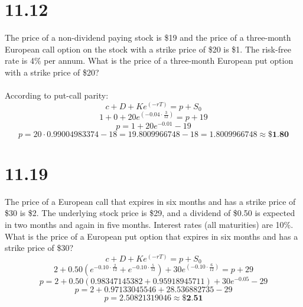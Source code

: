 \documentclass{article}
\begin{document}
\thispagestyle{firstpageheader}
{\Large 

\section*{11.12}
The price of a non-dividend paying stock is \$19 and the price of a three-month European call option on the stock with a strike price of \$20 is \$1. The risk-free rate is 4\% per annum. What
is the price of a three-month European put option with a strike price of \$20? \\ \\
According to put-call parity:
\[
  c + D + Ke^{(-rT)} = p + S_0
\]
\[
  1 + 0 + 20e^{(-0.04 \cdot \frac{3}{12})} = p + 19
\]
\[
  p = 1 + 20e^{-0.01} - 19
\]
\[
  p = 20 \cdot 0.99004983374 - 18 = 19.8009966748 - 18 = 1.8009966748 \approx \boxed{\textbf{\$1.80}}
\]


}
{\Large 

\section*{11.19}
The price of a European call that expires in six months and has a strike price of \$30 is \$2. The underlying stock price is \$29, and a dividend of \$0.50 is expected in two months and again in five months. Interest rates (all maturities) are 10\%. What is the price of a European put option that expires in six months and has a strike price of \$30?
\[
  c + D + Ke^{(-rT)} = p + S_0
\]
\[
  2 + 0.50(e^{-0.10 \cdot \frac{2}{12}} + e^{-0.10 \cdot \frac{5}{12}}) + 30e^{(-0.10 \cdot \frac{6}{12})} = p + 29
\]
\[
  p = 2 + 0.50(0.98347145382 + 0.95918945711) + 30e^{-0.05 } - 29
\]
\[
  p = 2 + 0.97133045546 + 28.536882735 - 29
\]
\[
  p = 2.50821319046 \approx \boxed{\textbf{\$2.51}}
\]

}
\end{document}
